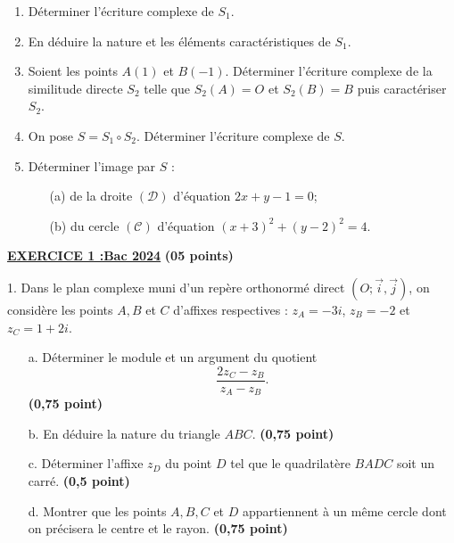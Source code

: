 \documentclass[12pt,a4paper]{article}
\begin{document}
\begin{enumerate}
    \item Déterminer l’écriture complexe de \( S_1 \).
    \item En déduire la nature et les éléments caractéristiques de \( S_1 \).
    \item Soient les points \( A(1) \) et \( B(-1) \). Déterminer l’écriture complexe de la similitude directe  
          \( S_2 \) telle que \( S_2(A) = O \) et \( S_2(B) = B \) puis caractériser \( S_2 \).
    \item On pose \( S = S_1 \circ S_2 \). Déterminer l’écriture complexe de \( S \).
    \item Déterminer l’image par \( S \) :
    \begin{enumerate}
        \item[(a)] de la droite \( (\mathscr{D}) \) d’équation \( 2x + y - 1 = 0 \);
        \item[(b)] du cercle \( (\mathscr{C}) \) d’équation \( (x + 3)^2 + (y - 2)^2 = 4 \).
    \end{enumerate}
\end{enumerate}

\textbf{\underline{EXERCICE 1 :Bac 2024}} \hfill \textbf{(05 points)}

\bigskip

1. Dans le plan complexe muni d’un repère orthonormé direct \( (O; \vec{i}, \vec{j}) \), on considère les points \( A, B \) et \( C \) d’affixes respectives :  
   \( z_A = -3i \), \( z_B = -2 \) et \( z_C = 1 + 2i \).

\begin{enumerate}
    \item[a.] Déterminer le module et un argument du quotient  
          \[
          \frac{2z_C - z_B}{z_A - z_B}.
          \]
          \hfill \textbf{(0,75 point)}
          
    \item[b.] En déduire la nature du triangle \( ABC \).  
          \hfill \textbf{(0,75 point)}
          
    \item[c.] Déterminer l’affixe \( z_D \) du point \( D \) tel que le quadrilatère \( BADC \) soit un carré.  
          \hfill \textbf{(0,5 point)}
          
    \item[d.] Montrer que les points \( A, B, C \) et \( D \) appartiennent à un même cercle dont on précisera le centre et le rayon.  
          \hfill \textbf{(0,75 point)}
\end{enumerate}
\end{document}

